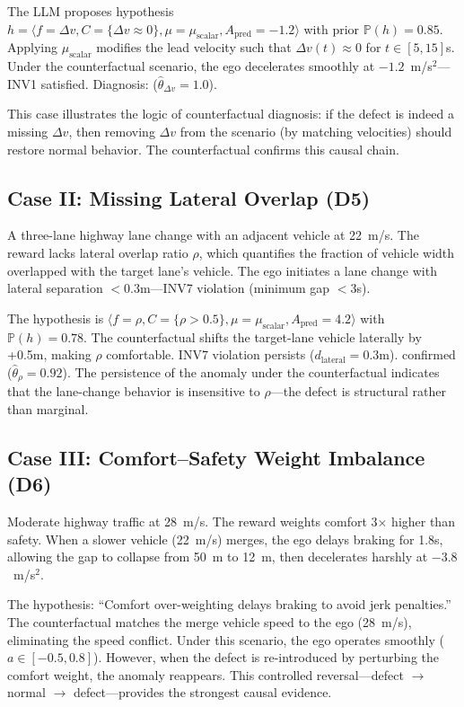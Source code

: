 \documentclass[journal]{IEEEtran}
\theoremstyle{plain}
\newcommand{\Prob}{\mathbb{P}}
\begin{document}
The LLM proposes hypothesis $h = \langle f=\Delta v, C=\{\Delta v \approx 0\}, \mu=\mu_{\text{scalar}}, A_{\text{pred}}=-1.2\rangle$ with prior $\Prob(h)=0.85$. Applying $\mu_{\text{scalar}}$ modifies the lead velocity such that $\Delta v(t) \approx 0$ for $t \in [5,15]$s. Under the counterfactual scenario, the ego decelerates smoothly at $-1.2$~m/s$^2$---INV1 satisfied. Diagnosis:  ($\hat{\theta}_{\Delta v}=1.0$).

This case illustrates the logic of counterfactual diagnosis: if the defect is indeed a missing $\Delta v$, then removing $\Delta v$ from the scenario (by matching velocities) should restore normal behavior. The counterfactual confirms this causal chain.

\subsection{Case II: Missing Lateral Overlap (D5)}

A three-lane highway lane change with an adjacent vehicle at 22~m/s. The reward lacks lateral overlap ratio $\rho$, which quantifies the fraction of vehicle width overlapped with the target lane's vehicle. The ego initiates a lane change with lateral separation $<0.3$m---INV7 violation (minimum gap $<3$s).

The hypothesis is $\langle f=\rho, C=\{\rho > 0.5\}, \mu=\mu_{\text{scalar}}, A_{\text{pred}}=4.2\rangle$ with $\Prob(h)=0.78$. The counterfactual shifts the target-lane vehicle laterally by +0.5m, making $\rho$ comfortable. INV7 violation persists ($d_{\text{lateral}}=0.3$m).  confirmed ($\hat{\theta}_\rho=0.92$). The persistence of the anomaly under the counterfactual indicates that the lane-change behavior is insensitive to $\rho$---the defect is structural rather than marginal.

\subsection{Case III: Comfort--Safety Weight Imbalance (D6)}

Moderate highway traffic at 28~m/s. The reward weights comfort 3$\times$ higher than safety. When a slower vehicle (22~m/s) merges, the ego delays braking for 1.8s, allowing the gap to collapse from 50~m to 12~m, then decelerates harshly at $-3.8$~m/s$^2$.

The hypothesis: ``Comfort over-weighting delays braking to avoid jerk penalties.'' The counterfactual matches the merge vehicle speed to the ego (28~m/s), eliminating the speed conflict. Under this scenario, the ego operates smoothly ($a \in [-0.5, 0.8]$). However, when the defect is re-introduced by perturbing the comfort weight, the anomaly reappears. This controlled reversal---defect $\to$ normal $\to$ defect---provides the strongest causal evidence.
\end{document}
